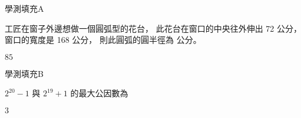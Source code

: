 \begin{QUESTIONS}
    \begin{QUESTION}
        \begin{ExamInfo}{91}{學測}{填充}{A}
        \end{ExamInfo}
        \begin{ExamAnsRateInfo}{28}{65}{17}{2}
        \end{ExamAnsRateInfo}
        \begin{QBODY}
            工匠在窗子外邊想做一個圓弧型的花台，
            此花台在窗口的中央往外伸出 72 公分，
            窗口的寬度是 168 公分，
            則此圓弧的圓半徑為 
            \TCNBOX{\TCN\TCN} 公分。
        \end{QBODY}
        \begin{QFROMS}
        \end{QFROMS}
        \begin{QTAGS}\end{QTAGS}
        \begin{QANS}
            $85$
        \end{QANS}
        \begin{QSOLLIST}
        \end{QSOLLIST}
        \begin{QEMPTYSPACE}
        \end{QEMPTYSPACE}
    \end{QUESTION}
    \begin{QUESTION}
        \begin{ExamInfo}{91}{學測}{填充}{B}
        \end{ExamInfo}
        \begin{ExamAnsRateInfo}{50}{70}{51}{29}
        \end{ExamAnsRateInfo}
        \begin{QBODY}
            $2^{20}-1$ 與 $2^{19}+1$ 的最大公因數為 
            \TCNBOX{\TCN}
        \end{QBODY}
        \begin{QFROMS}
        \end{QFROMS}
        \begin{QTAGS}\end{QTAGS}
        \begin{QANS}
            $3$
        \end{QANS}
        \begin{QSOLLIST}
        \end{QSOLLIST}
        \begin{QEMPTYSPACE}

\end{QEMPTYSPACE}
\end{QUESTION}
\end{QUESTIONS}

